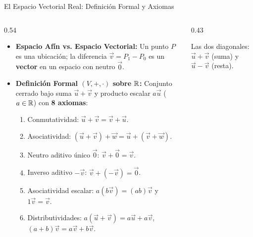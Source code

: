 \documentclass[10pt,aspectratio=169]{beamer}
\begin{document}
\begin{frame}{El Espacio Vectorial Real: Definición Formal y Axiomas}
  \begin{columns}[c]
    \begin{column}{0.54\textwidth}
      \footnotesize
      \begin{itemize}
        \item \textbf{Espacio Afín vs. Espacio Vectorial:} Un punto $P$ es una ubicación; la diferencia $\vec{v} = P_1 - P_0$ es un \textbf{vector} en un espacio con neutro $\vec{0}$.
        \item \textbf{Definición Formal $(V, +, \cdot)$ sobre $\mathbb{R}$:} Conjunto cerrado bajo suma $\vec{u}+\vec{v}$ y producto escalar $a\vec{u}$ ($a \in \mathbb{R}$) con \textbf{8 axiomas}:
        \begin{enumerate}
          \scriptsize
          \item Conmutatividad: $\vec{u} + \vec{v} = \vec{v} + \vec{u}$.
          \item Asociatividad: $(\vec{u}+\vec{v})+\vec{w} = \vec{u}+(\vec{v}+\vec{w})$.
          \item Neutro aditivo único $\vec{0}$: $\vec{v} + \vec{0} = \vec{v}$.
          \item Inverso aditivo $-\vec{v}$: $\vec{v} + (-\vec{v}) = \vec{0}$.
          \item Asociatividad escalar: $a(b\vec{v}) = (ab)\vec{v}$ y $1\vec{v} = \vec{v}$.
          \item Distributividades: $a(\vec{u}+\vec{v}) = a\vec{u}+a\vec{v}$, \ $(a+b)\vec{v} = a\vec{v}+b\vec{v}$.
        \end{enumerate}
      \end{itemize}
    \end{column}
    \begin{column}{0.43\textwidth}
      \centering
      \vspace{0.1cm}

      {\scriptsize Las dos diagonales: $\vec{u}+\vec{v}$ (suma) y $\vec{u}-\vec{v}$ (resta).}
    \end{column}
  \end{columns}
\end{frame}
\end{document}
